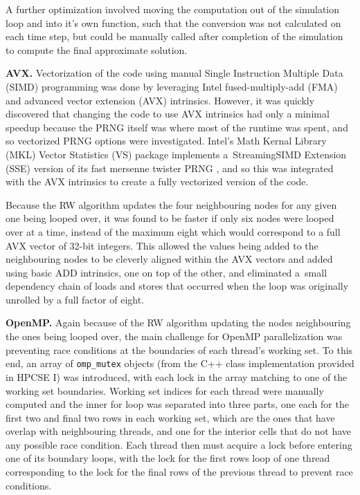 \documentclass[letterpaper]{article}
\newcommand{\mypar}[1]{{\bf #1.}}
\begin{document}
A further optimization involved moving the computation out of the simulation loop and into it's own function, such that the conversion was not calculated on each time step, but could be manually called after completion of the simulation to compute the final approximate solution.

\mypar{AVX}
Vectorization of the code using manual Single Instruction Multiple Data (SIMD) programming was done by leveraging Intel fused-multiply-add (FMA) and advanced vector extension (AVX) intrinsics. However, it was quickly discovered that changing the code to use AVX intrinsics had only a minimal speedup because the PRNG itself was where most of the runtime was spent, and so vectorized PRNG options were investigated. Intel's Math Kernal Library (MKL) Vector Statistics (VS) package implements a~Streaming\linebreak SIMD Extension (SSE) version of its fast mersenne twister PRNG \cite{SFMT}, and so this was integrated with the AVX intrinsics to create a fully vectorized version of the code.

Because the RW algorithm updates the four neighbouring nodes for any given one being looped over, it was found to be faster if only six nodes were looped over at a time, instead of the maximum eight which would correspond to a full AVX vector of 32-bit integers. This allowed the values being added to the neighbouring nodes to be cleverly aligned within the AVX vectors and added using basic ADD intrinsics, one on top of the other, and eliminated a~small dependency chain of loads and stores that occurred when the loop was originally unrolled by a full factor of eight.

\mypar{OpenMP}
Again because of the RW algorithm updating the nodes neighbouring the ones being looped over, the main challenge for OpenMP parallelization was preventing race conditions at the boundaries of each thread's working set. To this end, an array of {\tt omp\_mutex} objects (from the C++ class implementation provided in HPCSE I) was introduced, with each lock in the array matching to one of the working set boundaries. Working set indices for each thread were manually computed and the inner for loop was separated into three parts, one each for the first two and final two rows in each working set, which are the ones that have overlap with neighbouring threads, and one for the interior cells that do not have any possible race condition. Each thread then must acquire a lock before entering one of its boundary loops, with the lock for the first rows loop of one thread corresponding to the lock for the final rows of the previous thread to prevent race conditions.
\end{document}
